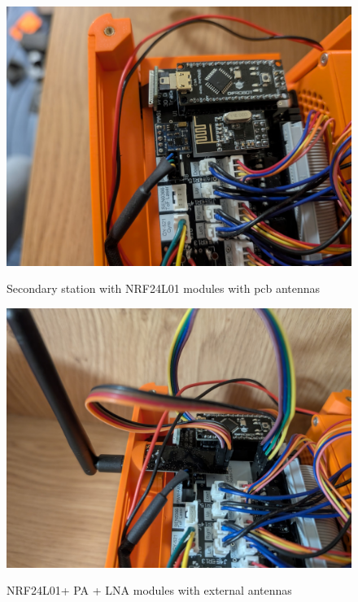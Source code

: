 \begin{figure}[H]
	\centering
	\begin{minipage}[b]{0.48\linewidth}
		\centering
		\includegraphics[width=\linewidth]{figures/old_antenna}
		\caption{Secondary station with NRF24L01 modules with \acrshort{pcb} antennas}
		\label{fig:oldantenna}
	\end{minipage}
	\hfill
	\begin{minipage}[b]{0.48\linewidth}
		\centering
		\includegraphics[width=\linewidth]{figures/new_antenna}
		\caption{NRF24L01+ PA + LNA \cite{nRF24L01_plus} modules with external antennas}
		\label{fig:newantenna}
	\end{minipage}
\end{figure}

